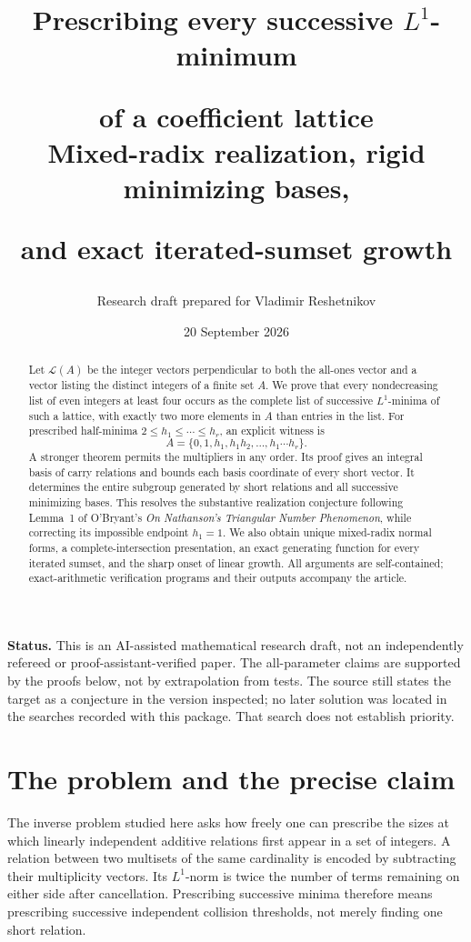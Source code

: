 \documentclass[11pt]{article}
\title{\color{Ink}\bfseries Prescribing every successive\texorpdfstring{ $L^1$}{ L1}-minimum\par
 of a coefficient lattice\\[0.5em]
 \large Mixed-radix realization, rigid minimizing bases,\par
 and exact iterated-sumset growth}
\author{Research draft prepared for Vladimir Reshetnikov}
\date{20 September 2026}
\numberwithin{equation}{section}
\theoremstyle{definition}
\theoremstyle{remark}\newtheorem{remark}[theorem]{Remark}
\newcommand{\Latt}{\mathcal L}
\begin{document}
\maketitle
\begin{abstract}
Let $\Latt(A)$ be the integer vectors perpendicular to both the all-ones
vector and a vector listing the distinct integers of a finite set $A$.
We prove that every nondecreasing list of even integers at least four occurs
as the complete list of successive $L^1$-minima of such a lattice, with exactly
two more elements in $A$ than entries in the list.  For prescribed half-minima
$2\le h_1\le\cdots\le h_r$, an explicit witness is
\[
 A=\{0,1,h_1,h_1h_2,\ldots,h_1\cdots h_r\}.
\]
A stronger theorem permits the multipliers in any order.  Its proof gives an
integral basis of carry relations and bounds each basis coordinate of every
short vector.  It determines the entire subgroup generated by short relations
and all successive minimizing bases.  This resolves the substantive
realization conjecture following Lemma~1 of O'Bryant's
\emph{On Nathanson's Triangular Number Phenomenon}, while correcting its
impossible endpoint $h_1=1$.  We also obtain unique mixed-radix normal forms,
a complete-intersection presentation, an exact generating function for every
iterated sumset, and the sharp onset of linear growth.  All arguments are
self-contained; exact-arithmetic verification programs and their outputs
accompany the article.
\end{abstract}

\noindent\colorbox{Wash}{\parbox{\dimexpr\linewidth-2\fboxsep\relax}{\small
\textbf{Status.} This is an AI-assisted mathematical research draft, not an
independently refereed or proof-assistant-verified paper.  The all-parameter
claims are supported by the proofs below, not by extrapolation from tests.
The source still states the target as a conjecture in the version inspected;
no later solution was located in the searches recorded with this package.
That search does not establish priority.}}

\clearpage
\tableofcontents
\clearpage

\section{The problem and the precise claim}

The inverse problem studied here asks how freely one can prescribe the
sizes at which linearly independent additive relations first appear in a set
of integers.  A relation between two multisets of the same cardinality is
encoded by subtracting their multiplicity vectors.  Its $L^1$-norm is twice
the number of terms remaining on either side after cancellation.  Prescribing
successive minima therefore means prescribing successive independent
collision thresholds, not merely finding one short relation.
\end{document}
